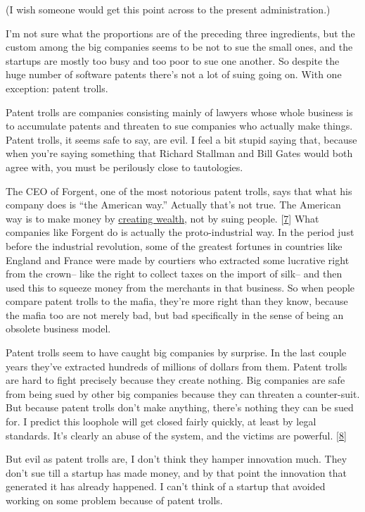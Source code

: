 (I wish someone would get this point across to the present
administration.)

I'm not sure what the proportions are of the preceding three
ingredients, but the custom among the big companies seems to be not to
sue the small ones, and the startups are mostly too busy and too poor to
sue one another. So despite the huge number of software patents there's
not a lot of suing going on. With one exception: patent trolls.

Patent trolls are companies consisting mainly of lawyers whose whole
business is to accumulate patents and threaten to sue companies who
actually make things. Patent trolls, it seems safe to say, are evil. I
feel a bit stupid saying that, because when you're saying something that
Richard Stallman and Bill Gates would both agree with, you must be
perilously close to tautologies.

The CEO of Forgent, one of the most notorious patent trolls, says that
what his company does is ``the American way.'' Actually that's not true.
The American way is to make money by \href{wealth.html}{creating
wealth}, not by suing people. {[}\hyperref[f7n]{7}{]} What companies
like Forgent do is actually the proto-industrial way. In the period just
before the industrial revolution, some of the greatest fortunes in
countries like England and France were made by courtiers who extracted
some lucrative right from the crown-- like the right to collect taxes on
the import of silk-- and then used this to squeeze money from the
merchants in that business. So when people compare patent trolls to the
mafia, they're more right than they know, because the mafia too are not
merely bad, but bad specifically in the sense of being an obsolete
business model.

Patent trolls seem to have caught big companies by surprise. In the last
couple years they've extracted hundreds of millions of dollars from
them. Patent trolls are hard to fight precisely because they create
nothing. Big companies are safe from being sued by other big companies
because they can threaten a counter-suit. But because patent trolls
don't make anything, there's nothing they can be sued for. I predict
this loophole will get closed fairly quickly, at least by legal
standards. It's clearly an abuse of the system, and the victims are
powerful. {[}\hyperref[f8n]{8}{]}

But evil as patent trolls are, I don't think they hamper innovation
much. They don't sue till a startup has made money, and by that point
the innovation that generated it has already happened. I can't think of
a startup that avoided working on some problem because of patent trolls.

